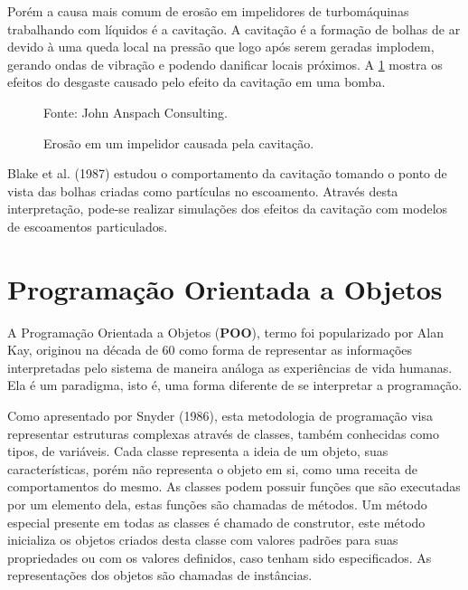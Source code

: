 Porém a causa mais comum de erosão em impelidores de turbomáquinas trabalhando com líquidos é a cavitação.
A cavitação é a formação de bolhas de ar devido à uma queda local na pressão que logo após serem geradas implodem, gerando ondas de vibração e podendo danificar locais próximos.
A \ref{JAC-Pump} mostra os efeitos do desgaste causado pelo efeito da cavitação em uma bomba.
\begin{figure}[H]
    \centering
     {\raggedleft \scriptsize Fonte: John Anspach Consulting\cite{JAC}.}
    \caption{Erosão em um impelidor causada pela cavitação.}
    \label{JAC-Pump}
\end{figure}

Blake et al. (1987)\cite{Blake-1987} estudou o comportamento da cavitação tomando o ponto de vista das bolhas criadas como partículas no escoamento.
Através desta interpretação, pode-se realizar simulações dos efeitos da cavitação com modelos de escoamentos particulados.


\section{\textbf{Programação Orientada a Objetos}}
\label{sec_rev_POO}
A Programação Orientada a Objetos (\textbf{POO}), termo foi popularizado por Alan Kay, originou na década de 60 como forma de representar as informações interpretadas pelo sistema de maneira análoga as experiências de vida humanas.
Ela é um paradigma, isto é, uma forma diferente de se interpretar a programação.

Como apresentado por Snyder (1986)\cite{Snyder-1986}, esta metodologia de programação visa representar estruturas complexas através de classes, também conhecidas como tipos, de variáveis.
Cada classe representa a ideia de um objeto, suas características, porém não representa o objeto em si, como uma receita de comportamentos do mesmo.
As classes podem possuir funções que são executadas por um elemento dela, estas funções são chamadas de métodos.
Um método especial presente em todas as classes é chamado de construtor, este método inicializa os objetos criados desta classe com valores padrões para suas propriedades ou com os valores definidos, caso tenham sido especificados.
As representações dos objetos são chamadas de instâncias.

